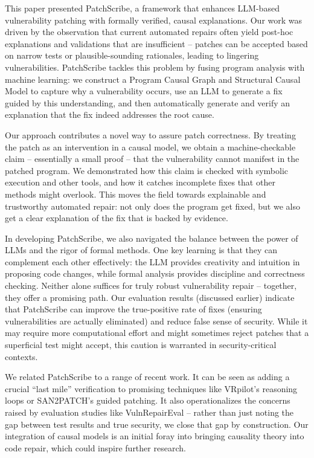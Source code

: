 \documentclass[conference,compsoc]{IEEEtran}
\begin{document}
This paper presented PatchScribe, a framework that enhances LLM-based
vulnerability patching with formally verified, causal explanations. Our
work was driven by the observation that current automated repairs often
yield post-hoc explanations and validations that are insufficient --
patches can be accepted based on narrow tests or plausible-sounding
rationales, leading to lingering vulnerabilities. PatchScribe tackles
this problem by fusing program analysis with machine learning: we
construct a Program Causal Graph and Structural Causal Model to capture
why a vulnerability occurs, use an LLM to generate a fix guided by this
understanding, and then automatically generate and verify an explanation
that the fix indeed addresses the root cause.

Our approach contributes a novel way to assure patch correctness. By
treating the patch as an intervention in a causal model, we obtain a
machine-checkable claim -- essentially a small proof -- that the
vulnerability cannot manifest in the patched program. We demonstrated
how this claim is checked with symbolic execution and other tools, and
how it catches incomplete fixes that other methods might overlook. This
moves the field towards explainable and trustworthy automated repair:
not only does the program get fixed, but we also get a clear explanation
of the fix that is backed by evidence.

In developing PatchScribe, we also navigated the balance between the
power of LLMs and the rigor of formal methods. One key learning is that
they can complement each other effectively: the LLM provides creativity
and intuition in proposing code changes, while formal analysis provides
discipline and correctness checking. Neither alone suffices for truly
robust vulnerability repair -- together, they offer a promising path.
Our evaluation results (discussed earlier) indicate that PatchScribe can
improve the true-positive rate of fixes (ensuring vulnerabilities are
actually eliminated) and reduce false sense of security. While it may
require more computational effort and might sometimes reject patches
that a superficial test might accept, this caution is warranted in
security-critical contexts.

We related PatchScribe to a range of recent work. It can be seen as
adding a crucial ``last mile'' verification to promising techniques like
VRpilot's reasoning loops or SAN2PATCH's guided patching. It also
operationalizes the concerns raised by evaluation studies like
VulnRepairEval -- rather than just noting the gap between test results
and true security, we close that gap by construction. Our integration of
causal models is an initial foray into bringing causality theory into
code repair, which could inspire further research.
\end{document}

